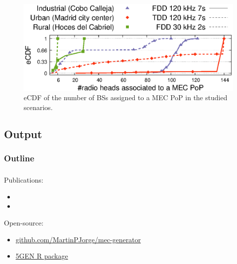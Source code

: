 \documentclass[aspectratio=169]{beamer}
\begin{document}
\begin{frame}

    \frametitle{\secname}
    \framesubtitle{\subsecname}

    \begin{figure}[t]
        \centering
        \includegraphics[width=.8\columnwidth]{img/cdfs}
        \vspace{1em}
        \caption{eCDF of the number of BSs assigned to a MEC PoP in the studied scenarios.}
        \label{fig:cdfs}
    \end{figure}
\end{frame}


\subsection{Output}
\begin{frame}
    \frametitle{Outline}
    \tableofcontents[subsectionstyle=show/shaded/hide,sectionstyle=show/shaded]
\end{frame}

\begin{frame}
    \frametitle{\secname}
    \framesubtitle{\subsecname}
    Publications:
    \begin{itemize}
        \item {}
        \item {}
    \end{itemize}
    Open-source:
    \begin{itemize}
        \item \url{github.com/MartinPJorge/mec-generator}
        \item \href{https://github.com/MartinPJorge/mec-generator/tree/5g-infra-gen}{5GEN R package}
    \end{itemize}
    

\end{frame}
\end{document}
